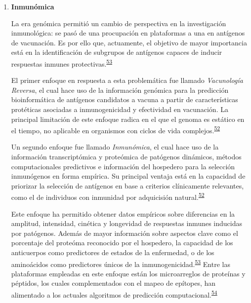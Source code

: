 \documentclass[]{article}
\begin{document}
\begin{enumerate}
  \begin{enumerate}
  \def\labelenumii{\roman{enumii}.}
  \item
    \textbf{Inmunómica}

    La era genómica permitió un cambio de perspectiva en la
    investigación inmunológica: se pasó de una procupación en
    plataformas a una en antígenos de vacunación. Es por ello que,
    actuamente, el objetivo de mayor importancia está en la
    identificación de subgrupos de antígenos capaces de inducir
    respuestas inmunes
    protectivas.\textsuperscript{\protect\hyperlink{ref-Davies2015Large}{53}}

    El primer enfoque en respuesta a esta problemática fue llamado
    \emph{Vacunología Reversa}, el cual hace uso de la información
    genómica para la predicción bioinformática de antígenos candidatos a
    vacuna a partir de características protéticas asociadas a
    inmunogenicidad y efectividad en vacunación. La principal limitación
    de este enfoque radica en el que el genoma es estático en el tiempo,
    no aplicable en organismos con ciclos de vida
    complejos.\textsuperscript{\protect\hyperlink{ref-immunomics2016}{52}}

    Un segundo enfoque fue llamado \emph{Inmunómica}, el cual hace uso
    de la información transcriptómica y proteómica de patógenos
    dinámicos, métodos computacionales predictivos e información del
    hospedero para la selección inmunógenos en forma empírica. Su
    principal ventaja está en la capacidad de priorizar la selección de
    antígenos en base a criterios clínicamente relevantes, como el de
    individuos con inmunidad por adquicisión
    natural.\textsuperscript{\protect\hyperlink{ref-immunomics2016}{52}}

    Este enfoque ha permitido obtener datos empíricos sobre diferencias
    en la amplitud, intensidad, cinética y longevidad de respuestas
    inmunes inducidas por patógenos. Además de mayor información sobre
    aspectos clave como el porcentaje del proteóma reconocido por el
    hospedero, la capacidad de los anticuerpos como predictores de
    estados de la enfermedad, o de los aminoácidos como predictores
    únicos de la
    inmunogenicidad.\textsuperscript{\protect\hyperlink{ref-Davies2015Large}{53}}
    Entre las plataformas empleadas en este enfoque están los
    microarreglos de proteínas y péptidos, los cuales complementados con
    el mapeo de epítopes, han alimentado a los actuales algoritmos de
    predicción
    computacional.\textsuperscript{\protect\hyperlink{ref-carmona2015peptide}{54}}
  \end{enumerate}
\end{enumerate}
\end{document}
